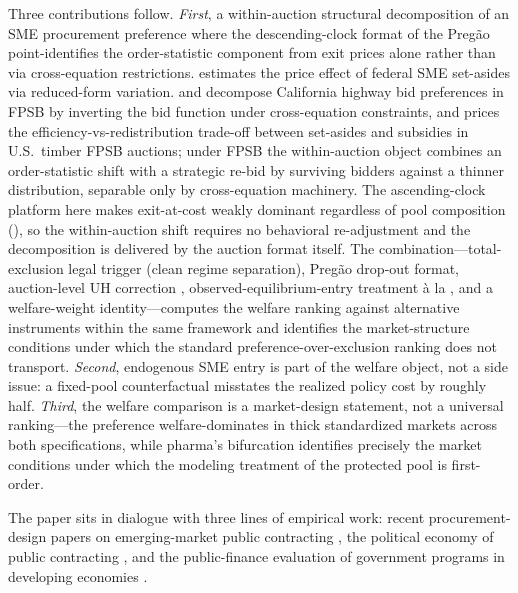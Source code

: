 Three contributions follow. \emph{First}, a within-auction structural decomposition of an SME procurement preference where the descending-clock format of the Preg\~ao point-identifies the order-statistic component from exit prices alone \citep{haile2003} rather than via cross-equation restrictions. \citet{marion2007} estimates the price effect of federal SME set-asides via reduced-form variation. \citet{krasnokutskaya2011} and \citet{krasnokutskayaseim2011} decompose California highway bid preferences in FPSB by inverting the bid function under cross-equation constraints, and \citet{athey2013} prices the efficiency-vs-redistribution trade-off between set-asides and subsidies in U.S.\ timber FPSB auctions; under FPSB the within-auction object combines an order-statistic shift with a strategic re-bid by surviving bidders against a thinner distribution, separable only by cross-equation machinery. The ascending-clock platform here makes exit-at-cost weakly dominant regardless of pool composition (\citealp{haile2003}), so the within-auction shift requires no behavioral re-adjustment and the decomposition is delivered by the auction format itself. The combination---total-exclusion legal trigger (clean regime separation), Preg\~ao drop-out format, auction-level UH correction \citep{krasnokutskaya2011}, observed-equilibrium-entry treatment \`a la \citet{atheyseira2011}, and a \citet{saezstantcheva2016} welfare-weight identity---computes the welfare ranking against alternative instruments within the same framework and identifies the market-structure conditions under which the standard preference-over-exclusion ranking does not transport. \emph{Second}, endogenous SME entry is part of the welfare object, not a side issue: a fixed-pool counterfactual misstates the realized policy cost by roughly half. \emph{Third}, the welfare comparison is a market-design statement, not a universal ranking---the \optPrefThreshold{} preference welfare-dominates in thick standardized markets across both specifications, while pharma's bifurcation identifies precisely the market conditions under which the modeling treatment of the protected pool is first-order.

The paper sits in dialogue with three lines of empirical work: recent procurement-design papers on emerging-market public contracting \citep{decarolis2024, coviello2026, ferraz2016, szerman2023}, the political economy of public contracting \citep{colonnelli2022}, and the public-finance evaluation of government programs in developing economies \citep{best2023, bandiera2021, olken2007}.

